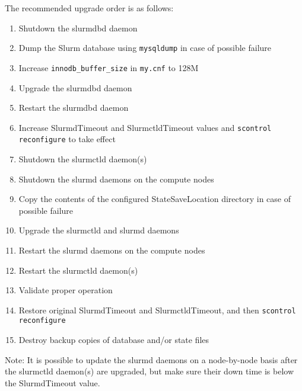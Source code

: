 The recommended upgrade order is as follows:

    \begin{enumerate}
    \item Shutdown the slurmdbd daemon
    \item Dump the Slurm database using \texttt{mysqldump} in case of possible failure
    \item Increase \texttt{innodb\_buffer\_size} in \texttt{my.cnf} to 128M
    \item Upgrade the slurmdbd daemon
    \item Restart the slurmdbd daemon
    \item Increase SlurmdTimeout and SlurmctldTimeout values and \texttt{scontrol reconfigure} to take effect
    \item Shutdown the slurmctld daemon(s)
    \item Shutdown the slurmd daemons on the compute nodes
    \item Copy the contents of the configured StateSaveLocation directory in case of possible failure
    \item Upgrade the slurmctld and slurmd daemons
    \item Restart the slurmd daemons on the compute nodes
    \item Restart the slurmctld daemon(s)
    \item Validate proper operation
    \item Restore original SlurmdTimeout and SlurmctldTimeout, and then \texttt{scontrol reconfigure}
    \item Destroy backup copies of database and/or state files
    \end{enumerate}

Note: It is possible to update the slurmd daemons on a node-by-node basis after the slurmctld daemon(s) are upgraded, but make sure their down time is below the SlurmdTimeout value.
